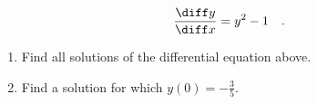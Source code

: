 \begin{equation}\label{eqDFQseparable-yprime=ysquared-1}
\frac{\diff y}{\diff x}= y^2-1\quad .
\end{equation}
\begin{enumerate}[ref={\fcProblemRef}]
\item \label{problemDFQseparable-yprime=ysquared-1-part1} Find all solutions of the differential equation above.
\item \label{problemDFQseparable-yprime=ysquared-1-part2} Find a solution for which $y(0)=-\frac{3}{5}$.
\end{enumerate}
